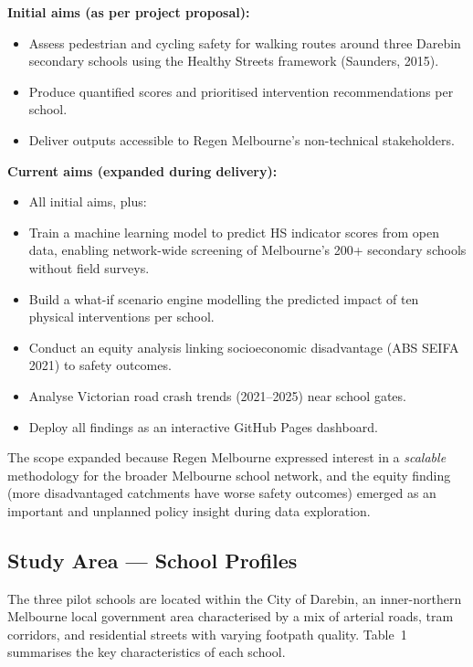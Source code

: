\documentclass[11pt,a4paper]{article}
\begin{document}
\textbf{Initial aims (as per project proposal):}
\begin{itemize}
  \item Assess pedestrian and cycling safety for walking routes around three Darebin secondary schools using the Healthy Streets framework (Saunders, 2015).
  \item Produce quantified scores and prioritised intervention recommendations per school.
  \item Deliver outputs accessible to Regen Melbourne's non-technical stakeholders.
\end{itemize}

\textbf{Current aims (expanded during delivery):}
\begin{itemize}
  \item All initial aims, plus:
  \item Train a machine learning model to predict HS indicator scores from open data, enabling network-wide screening of Melbourne's 200+ secondary schools without field surveys.
  \item Build a what-if scenario engine modelling the predicted impact of ten physical interventions per school.
  \item Conduct an equity analysis linking socioeconomic disadvantage (ABS SEIFA 2021) to safety outcomes.
  \item Analyse Victorian road crash trends (2021--2025) near school gates.
  \item Deploy all findings as an interactive GitHub Pages dashboard.
\end{itemize}

The scope expanded because Regen Melbourne expressed interest in a \textit{scalable} methodology for the broader Melbourne school network, and the equity finding (more disadvantaged catchments have worse safety outcomes) emerged as an important and unplanned policy insight during data exploration.

\subsection{Study Area — School Profiles}

The three pilot schools are located within the City of Darebin, an inner-northern Melbourne local government area characterised by a mix of arterial roads, tram corridors, and residential streets with varying footpath quality. Table~1 summarises the key characteristics of each school.
\end{document}
